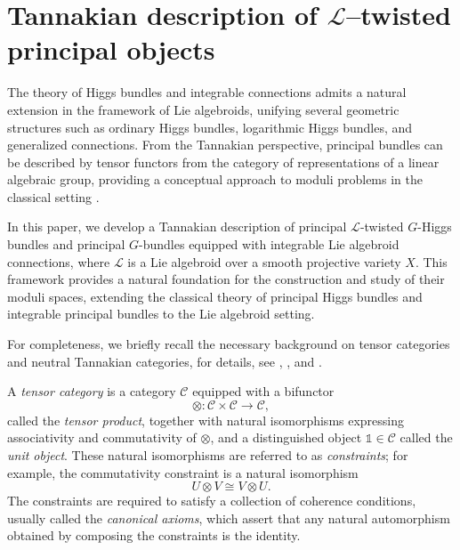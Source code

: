 \documentclass[12pt,reqno]{amsart}
\numberwithin{equation}{subsection}
\theoremstyle{definition}
\theoremstyle{theorem}
\begin{document}



\section{Tannakian description of $\mathcal{L}$--twisted principal objects}\label{sec:Tannakian Considerations}

The theory of Higgs bundles and integrable connections admits a natural extension in the framework of Lie algebroids, unifying several geometric structures such as ordinary Higgs bundles, logarithmic Higgs bundles, and generalized connections. From the Tannakian perspective, principal bundles can be described by tensor functors from the category of representations of a linear algebraic group, providing a conceptual approach to moduli problems in the classical setting \cite{CT.Simpson-1995}.

In this paper, we develop a Tannakian description of principal $\mathcal{L}$-twisted $G$-Higgs bundles and principal $G$-bundles equipped with integrable Lie algebroid connections, where $\mathcal{L}$ is a Lie algebroid over a smooth projective variety $X$. This framework provides a natural foundation for the construction and study of their moduli spaces, extending the classical theory of principal Higgs bundles and integrable principal bundles to the Lie algebroid setting.


For completeness, we briefly recall the necessary background on tensor categories and neutral Tannakian categories, for details, see \cite[Chapters~1--2]{J.S.Milne-2025}, \cite{Deligne-Milne-Ogus-Shih-1982}, and \cite[\S\,6]{CT. Simpson-1992}.


A \emph{tensor category} is a category $\mathcal{C}$ equipped with a bifunctor
\[
\otimes : \mathcal{C} \times \mathcal{C} \longrightarrow \mathcal{C},
\]
called the \emph{tensor product}, together with natural isomorphisms expressing
associativity and commutativity of $\otimes$, and a distinguished object
$\mathbb{1} \in \mathcal{C}$ called the \emph{unit object}.  
These natural isomorphisms are referred to as \emph{constraints}; for example,
the commutativity constraint is a natural isomorphism
\[
U \otimes V \cong V \otimes U.
\]
The constraints are required to satisfy a collection of coherence conditions,
usually called the \emph{canonical axioms}, which assert that any natural
automorphism obtained by composing the constraints is the identity.
\end{document}
